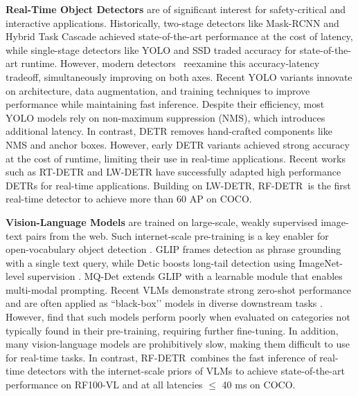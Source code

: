 \documentclass{article} %
\newcommand{\method}{RF-DETR}
\begin{document}
\textbf{Real-Time Object Detectors} are of significant interest for safety-critical and interactive applications. Historically, two-stage detectors like Mask-RCNN \citep{he2017mask} and Hybrid Task Cascade \citep{chen2019hybrid} achieved state-of-the-art performance at the cost of latency, while single-stage detectors like YOLO \citep{redmon2016you} and SSD \citep{liu2016ssd} traded accuracy for state-of-the-art runtime. However, modern detectors~\citep{zhao2024rtdetr} reexamine this accuracy-latency tradeoff, simultaneously improving on both axes. Recent YOLO variants innovate on architecture, data augmentation, and training techniques \citep{redmon2016you,wang2023yolov7,wang2024yolov9,yolov8,yolov11} to improve performance while maintaining fast inference. Despite their efficiency, most YOLO models rely on non-maximum suppression (NMS), which introduces additional latency. In contrast, DETR \citep{carion2020end} removes hand-crafted components like NMS and anchor boxes. However, early DETR variants \citep{zhu2020deformable, zhang2022dino, meng2021conditional, liu2022dab} achieved strong accuracy at the cost of runtime, limiting their use in real-time applications. Recent works such as RT-DETR \citep{zhao2024rtdetr} and LW-DETR \citep{chen2024lw} have successfully adapted high performance DETRs for real-time applications. Building on LW-DETR, \method \ is the first real-time detector to achieve more than 60 AP on COCO. 

\textbf{Vision-Language Models} are trained on large-scale, weakly supervised image-text pairs from the web. Such internet-scale pre-training is a key enabler for open-vocabulary object detection \citep{liu2023grounding, Cheng2024YOLOWorld}. GLIP \citep{li2021grounded} frames detection as phrase grounding with a single text query, while Detic \citep{zhou2022detecting} boosts long-tail detection using ImageNet-level supervision \citep{russakovsky2015imagenet}. MQ-Det \citep{xu2024multi} extends GLIP with a learnable module that enables multi-modal prompting. Recent VLMs demonstrate strong zero-shot performance and are often applied as “black-box’’ models in diverse downstream tasks \citep{ma2023long, pmlr-v205-peri23a, khurana2024shelf, sal2024eccv, takmaz2025cal}. However, \citet{robicheaux2025roboflow100vl} find that such models perform poorly when evaluated on categories not typically found in their pre-training, requiring further fine-tuning. In addition, many vision-language models are prohibitively slow, making them difficult to use for real-time tasks. In contrast, \method \ combines the fast inference of real-time detectors with the internet-scale priors of VLMs to achieve state-of-the-art performance on RF100-VL and at all latencies $\leq$ 40 ms on COCO.
\end{document}
